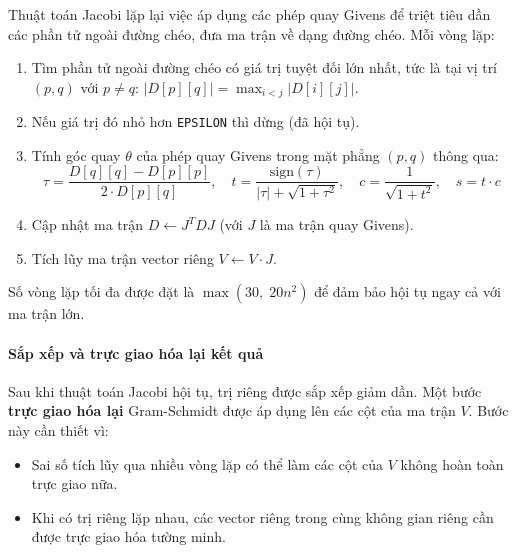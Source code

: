 Thuật toán Jacobi lặp lại việc áp dụng các phép quay Givens để triệt tiêu dần các phần tử ngoài đường chéo, đưa ma trận về dạng đường chéo. Mỗi vòng lặp:
\begin{enumerate}
    \item Tìm phần tử ngoài đường chéo có giá trị tuyệt đối lớn nhất, tức là tại vị trí $(p, q)$ với $p \neq q$: $|D[p][q]| = \max_{i < j} |D[i][j]|$.
    \item Nếu giá trị đó nhỏ hơn \texttt{EPSILON} thì dừng (đã hội tụ).
    \item Tính góc quay $\theta$ của phép quay Givens trong mặt phẳng $(p, q)$ thông qua:
    \begin{equation}
        \tau = \frac{D[q][q] - D[p][p]}{2 \cdot D[p][q]}, \quad
        t = \frac{\text{sign}(\tau)}{|\tau| + \sqrt{1 + \tau^2}}, \quad
        c = \frac{1}{\sqrt{1 + t^2}}, \quad s = t \cdot c
    \end{equation}
    \item Cập nhật ma trận $D \leftarrow J^T D J$ (với $J$ là ma trận quay Givens).
    \item Tích lũy ma trận vector riêng $V \leftarrow V \cdot J$.
\end{enumerate}

Số vòng lặp tối đa được đặt là $\max(30,\; 20n^2)$ để đảm bảo hội tụ ngay cả với ma trận lớn.

\paragraph{Sắp xếp và trực giao hóa lại kết quả}

Sau khi thuật toán Jacobi hội tụ, trị riêng được sắp xếp giảm dần. Một bước \textbf{trực giao hóa lại} Gram-Schmidt được áp dụng lên các cột của ma trận $V$. Bước này cần thiết vì:
\begin{itemize}
    \item Sai số tích lũy qua nhiều vòng lặp có thể làm các cột của $V$ không hoàn toàn trực giao nữa.
    \item Khi có trị riêng lặp nhau, các vector riêng trong cùng không gian riêng cần được trực giao hóa tường minh.
\end{itemize}


